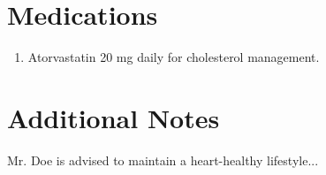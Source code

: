 \documentclass[letterpaper,11pt]{article}
\newcommand{\paragraphSection}[2]{
  \section{#1}
  \vspace{-0.2cm}
  \begin{justify}
    #2
  \end{justify}
  \vspace{0.4cm}
}
\newcommand{\numberedSection}[2]{
  \section{#1}
  \vspace{-0.2cm}
  \begin{enumerate}[leftmargin=0.7cm, label=\arabic*., itemsep=0pt]
    #2
  \end{enumerate}
  \vspace{0.4cm}
}
\newcommand{\numberedItem}[1]{
  \item #1
}
\begin{document}
\numberedSection{Medications}{
    \numberedItem{Atorvastatin 20 mg daily for cholesterol management.}

}

\paragraphSection{Additional Notes}{
  Mr. Doe is advised to maintain a heart-healthy lifestyle...
}
\end{document}

